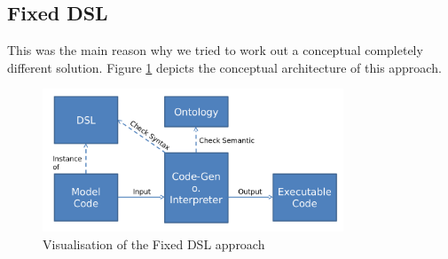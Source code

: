 \subsection{Fixed DSL}
\par
This was the main reason why we tried to work out a conceptual completely different solution. Figure \ref{fig:visualisation_fixed_dsl} depicts the conceptual architecture of this approach.
\begin{figure}[h]
	\centering
	\includegraphics[width=0.8\textwidth]{pics/generation_of_a_dsl/binding2.png}
	\caption{Visualisation of the Fixed DSL approach \label{fig:visualisation_fixed_dsl}}	
\end{figure}

